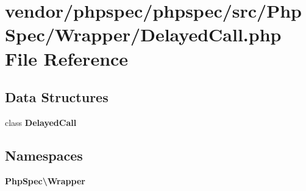 \section{vendor/phpspec/phpspec/src/\+Php\+Spec/\+Wrapper/\+Delayed\+Call.php File Reference}
\label{_delayed_call_8php}
\subsection*{Data Structures}
\begin{DoxyCompactItemize}
\item 
class {\bf Delayed\+Call}
\end{DoxyCompactItemize}
\subsection*{Namespaces}
\begin{DoxyCompactItemize}
\item 
 {\bf Php\+Spec\textbackslash{}\+Wrapper}
\end{DoxyCompactItemize}
